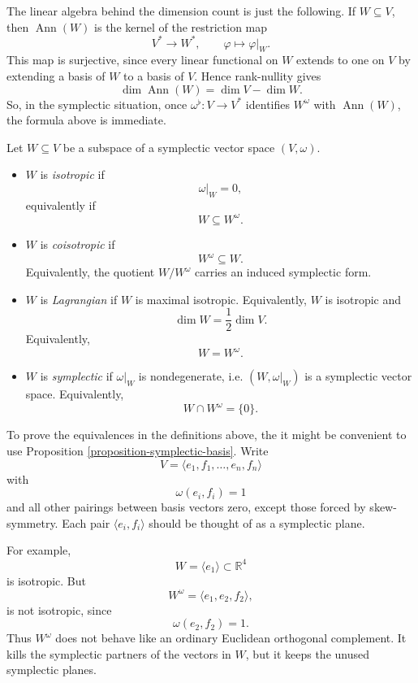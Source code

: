 \medskip\noindent
The linear algebra behind the dimension count
is just the following. If $W \subseteq V$,
then $\operatorname{Ann}(W)$ is the kernel of
the restriction map
$$
V^* \longrightarrow W^*,
\qquad
\varphi \longmapsto \varphi|_W.
$$
This map is surjective, since every linear
functional on $W$ extends to one on $V$ by
extending a basis of $W$ to a basis of $V$.
Hence rank-nullity gives
$$
\dim \operatorname{Ann}(W)
=
\dim V-\dim W.
$$
So, in the symplectic situation, once
$\omega^\flat:V\to V^*$ identifies
$W^\omega$ with $\operatorname{Ann}(W)$,
the formula above is immediate.

\begin{definition}
\label{definition-symplectic-subspaces}
Let $W \subseteq V$ be a subspace of a
symplectic vector space $(V,\omega)$.
\begin{itemize}
\item $W$ is {\it isotropic} if
$$
\omega|_W=0,$$
equivalently if
$$
W\subseteq W^\omega.
$$

\item $W$ is {\it coisotropic} if
$$
W^\omega\subseteq W.
$$
Equivalently, the quotient
$W/W^\omega$ carries an induced symplectic
form.

\item $W$ is {\it Lagrangian} if $W$ is
maximal isotropic. Equivalently, $W$ is
isotropic and
$$
\dim W=\frac{1}{2}\dim V.
$$
Equivalently,
$$
W=W^\omega.
$$

\item $W$ is {\it symplectic} if
$\omega|_W$ is nondegenerate,
i.e. $(W,\omega|_W)$
is a symplectic vector space. Equivalently,
$$
W\cap W^\omega=\{0\}.
$$
\end{itemize}
\end{definition}

\medskip\noindent
To prove the equivalences
in the definitions above, the
it might be convenient to use 
Proposition 
\ref{proposition-symplectic-basis}.
Write
$$
V=\langle e_1,f_1,\ldots,e_n,f_n\rangle
$$
with
$$
\omega(e_i,f_i)=1
$$
and all other pairings between basis vectors
zero, except those forced by skew-symmetry.
Each pair $\langle e_i,f_i\rangle$ should be
thought of as a symplectic plane.

\medskip\noindent
For example,
$$
W=\langle e_1\rangle\subset \mathbb R^4
$$
is isotropic. But
$$
W^\omega=\langle e_1,e_2,f_2\rangle,
$$
is not isotropic, since
$$
\omega(e_2,f_2)=1.
$$
Thus $W^\omega$ does not behave like an
ordinary Euclidean orthogonal complement.
It kills the symplectic partners of the
vectors in $W$, but it keeps the unused
symplectic planes.

